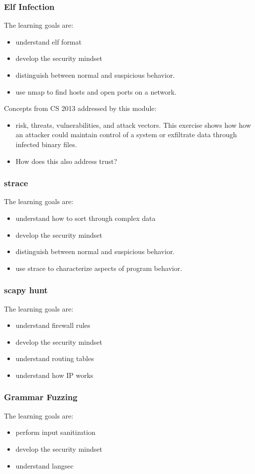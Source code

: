 \subsubsection{Elf Infection}
The learning goals are:
\begin{itemize}
\item understand elf format
\item develop the security mindset
\item distinguish between normal and suspicious behavior.
\item use nmap to find hosts and open ports on a network.
\end{itemize}
Concepts from CS 2013 addressed by this module:
\begin{itemize}
\item  risk, threats, vulnerabilities, and attack vectors.  This exercise shows how how an attacker
  could maintain control of a system or exfiltrate data through infected binary files.
\item How does this also address trust?
\end{itemize}

\subsubsection{strace}
The learning goals are:
\begin{itemize}
\item understand how to sort through complex data
\item develop the security mindset
\item distinguish between normal and suspicious behavior.
\item use strace to characterize aspects of program behavior.
\end{itemize}


\subsubsection{scapy hunt}
The learning goals are:
\begin{itemize}
\item understand firewall rules
\item develop the security mindset
\item understand routing tables
\item understand how IP works
\end{itemize}

\subsubsection{Grammar Fuzzing}
The learning goals are:
\begin{itemize}
\item perform input sanitization
\item develop the security mindset
\item understand langsec
\end{itemize}

